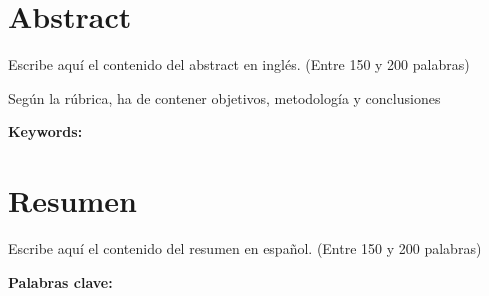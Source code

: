   \clearpage
  \chapter*{Abstract}

  
  Escribe aquí el contenido del abstract en inglés. (Entre 150 y 200 palabras)

  Según la rúbrica, ha de contener objetivos, metodología y conclusiones

  \vspace{1cm}
  \textbf{Keywords:} %


  \clearpage
  \chapter*{Resumen}
  Escribe aquí el contenido del resumen en español. (Entre 150 y 200 palabras)

  \vspace{1cm}
  \textbf{Palabras clave:} %
  